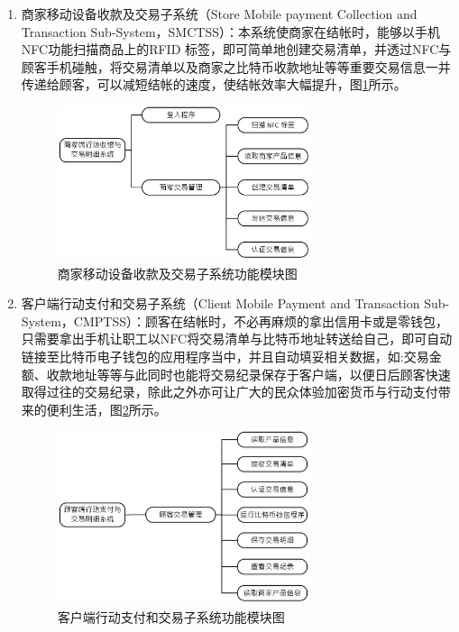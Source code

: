 \begin{enumerate}
		\item 商家移动设备收款及交易子系统（Store Mobile payment Collection and Transaction Sub-System，SMCTSS）：本系统使商家在结帐时，能够以手机NFC功能扫描商品上的RFID 标签，即可简单地创建交易清单，并透过NFC与顾客手机碰触，将交易清单以及商家之比特币收款地址等等重要交易信息一并传递给顾客，可以减短结帐的速度，使结帐效率大幅提升，图\ref{model3}所示。
		 
			\begin{figure}[!htbp]
			\centering
			\includegraphics[width = 0.7\textwidth]{model3.jpg}
			\caption{商家移动设备收款及交易子系统功能模块图}\label{model3}
			\end{figure}


		\item 客户端行动支付和交易子系统（Client Mobile Payment and Transaction Sub-System，CMPTSS）：顾客在结帐时，不必再麻烦的拿出信用卡或是零钱包，只需要拿出手机让职工以NFC将交易清单与比特币地址转送给自己，即可自动链接至比特币电子钱包的应用程序当中，并且自动填妥相关数据，如:交易金额、收款地址等等与此同时也能将交易纪录保存于客户端，以便日后顾客快速取得过往的交易纪录，除此之外亦可让广大的民众体验加密货币与行动支付带来的便利生活，图\ref{model2}所示。
			\begin{figure}[!htbp]
			\centering
			\includegraphics[width = 0.7\textwidth]{model2.jpg}
			\caption{客户端行动支付和交易子系统功能模块图}\label{model2}
			\end{figure}
		
	\end{enumerate}
	

